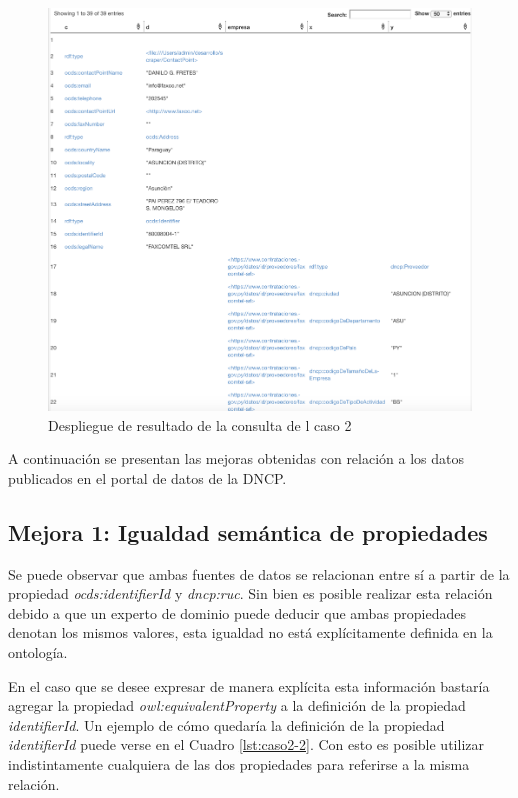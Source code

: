  \begin{figure}[ht!]
    \centering
    \includegraphics[width=150mm]{figuras/caso2Resultado.png}
    \caption{Despliegue de resultado de la consulta de l caso 2}
    \label{img:caso2Resultado}
 \end{figure}



A continuación se presentan las mejoras obtenidas con relación a los datos publicados en el portal de datos de la DNCP.
 
 \subsection{Mejora 1: Igualdad semántica de propiedades}
 Se puede observar que ambas fuentes de datos se relacionan entre sí a partir de la propiedad \textit{ocds:identifierId} y \textit{dncp:ruc}. Sin bien es posible realizar esta relación debido a que un experto de dominio puede deducir que ambas propiedades denotan los mismos valores, esta igualdad no está explícitamente definida en la ontología. 
 
 En el caso que se desee expresar de manera explícita esta información bastaría agregar la propiedad \textit{owl:equivalentProperty}  a la definición de la propiedad \textit{identifierId}. Un ejemplo de cómo quedaría la definición de la propiedad \textit{identifierId} puede verse en el Cuadro \ref{lst:caso2-2}. Con esto es posible utilizar indistintamente cualquiera de las dos propiedades para referirse a la misma relación.\hfill \break

